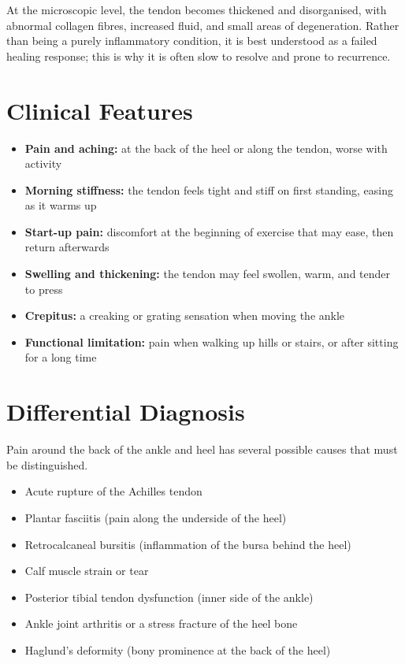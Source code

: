 At the microscopic level, the tendon becomes thickened and disorganised, with abnormal collagen fibres, increased fluid, and small areas of degeneration. Rather than being a purely inflammatory condition, it is best understood as a failed healing response; this is why it is often slow to resolve and prone to recurrence.

\section*{Clinical Features}
\begin{itemize}
    \item \textbf{Pain and aching:} at the back of the heel or along the tendon, worse with activity
    \item \textbf{Morning stiffness:} the tendon feels tight and stiff on first standing, easing as it warms up
    \item \textbf{Start-up pain:} discomfort at the beginning of exercise that may ease, then return afterwards
    \item \textbf{Swelling and thickening:} the tendon may feel swollen, warm, and tender to press
    \item \textbf{Crepitus:} a creaking or grating sensation when moving the ankle
    \item \textbf{Functional limitation:} pain when walking up hills or stairs, or after sitting for a long time
\end{itemize}

\section*{Differential Diagnosis}
Pain around the back of the ankle and heel has several possible causes that must be distinguished.

\begin{itemize}
    \item Acute rupture of the Achilles tendon
    \item Plantar fasciitis (pain along the underside of the heel)
    \item Retrocalcaneal bursitis (inflammation of the bursa behind the heel)
    \item Calf muscle strain or tear
    \item Posterior tibial tendon dysfunction (inner side of the ankle)
    \item Ankle joint arthritis or a stress fracture of the heel bone
    \item Haglund's deformity (bony prominence at the back of the heel)
\end{itemize}

